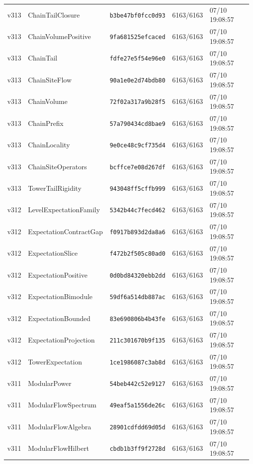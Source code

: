 \documentclass[11pt]{article}
\theoremstyle{definition}\newtheorem{deriv}{Derivation}
\begin{document}
{\begin{longtable}{@{}lllll@{}}
v313 & ChainTailClosure & \texttt{b3be47bf0fcc0d93} & 6163/6163 & 07/10 19:08:57 \\
v313 & ChainVolumePositive & \texttt{9fa681525efcaced} & 6163/6163 & 07/10 19:08:57 \\
v313 & ChainTail & \texttt{fdfe27e5f54e96e0} & 6163/6163 & 07/10 19:08:57 \\
v313 & ChainSiteFlow & \texttt{90a1e0e2d74bdb80} & 6163/6163 & 07/10 19:08:57 \\
v313 & ChainVolume & \texttt{72f02a317a9b28f5} & 6163/6163 & 07/10 19:08:57 \\
v313 & ChainPrefix & \texttt{57a790434cd8bae9} & 6163/6163 & 07/10 19:08:57 \\
v313 & ChainLocality & \texttt{9e0ce48c9cf735d4} & 6163/6163 & 07/10 19:08:57 \\
v313 & ChainSiteOperators & \texttt{bcffce7e08d267df} & 6163/6163 & 07/10 19:08:57 \\
v313 & TowerTailRigidity & \texttt{943048ff5cffb999} & 6163/6163 & 07/10 19:08:57 \\
v312 & LevelExpectationFamily & \texttt{5342b44c7fecd462} & 6163/6163 & 07/10 19:08:57 \\
v312 & ExpectationContractGap & \texttt{f0917b893d2da8a6} & 6163/6163 & 07/10 19:08:57 \\
v312 & ExpectationSlice & \texttt{f472b2f505c80ad0} & 6163/6163 & 07/10 19:08:57 \\
v312 & ExpectationPositive & \texttt{0d0bd84320ebb2dd} & 6163/6163 & 07/10 19:08:57 \\
v312 & ExpectationBimodule & \texttt{59df6a514db887ac} & 6163/6163 & 07/10 19:08:57 \\
v312 & ExpectationBounded & \texttt{83e690806b4b43fe} & 6163/6163 & 07/10 19:08:57 \\
v312 & ExpectationProjection & \texttt{211c301670b9f135} & 6163/6163 & 07/10 19:08:57 \\
v312 & TowerExpectation & \texttt{1ce1986087c3ab8d} & 6163/6163 & 07/10 19:08:57 \\
v311 & ModularPower & \texttt{54beb442c52e9127} & 6163/6163 & 07/10 19:08:57 \\
v311 & ModularFlowSpectrum & \texttt{49eaf5a1556de26c} & 6163/6163 & 07/10 19:08:57 \\
v311 & ModularFlowAlgebra & \texttt{28901cdfdd69d05d} & 6163/6163 & 07/10 19:08:57 \\
v311 & ModularFlowHilbert & \texttt{cbdb1b3ff9f2728d} & 6163/6163 & 07/10 19:08:57 \\

\end{longtable}}
\end{document}
